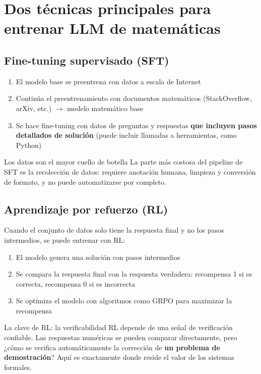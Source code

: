 \section{Dos técnicas principales para entrenar LLM de matemáticas}

\subsection{Fine-tuning supervisado (SFT)}

\begin{enumerate}
    \item El modelo base se preentrena con datos a escala de Internet
    \item Continúa el preentrenamiento con documentos matemáticos (StackOverflow, arXiv, etc.) $\to$ modelo matemático base
    \item Se hace fine-tuning con datos de preguntas y respuestas \textbf{que incluyen pasos detallados de solución} (puede incluir llamadas a herramientas, como Python)
\end{enumerate}

\begin{warningbox}{Los datos son el mayor cuello de botella}
La parte más costosa del pipeline de SFT es la recolección de datos: requiere anotación humana, limpieza y conversión de formato, y no puede automatizarse por completo.
\end{warningbox}

\subsection{Aprendizaje por refuerzo (RL)}

Cuando el conjunto de datos solo tiene la respuesta final y no los pasos intermedios, se puede entrenar con RL:
\begin{enumerate}
    \item El modelo genera una solución con pasos intermedios
    \item Se compara la respuesta final con la respuesta verdadera: recompensa 1 si es correcta, recompensa 0 si es incorrecta
    \item Se optimiza el modelo con algoritmos como GRPO para maximizar la recompensa
\end{enumerate}

\begin{importantbox}{La clave de RL: la verificabilidad}
RL depende de una señal de verificación confiable. Las respuestas numéricas se pueden comparar directamente, pero ¿cómo se verifica automáticamente la corrección de \textbf{un problema de demostración}? Aquí es exactamente donde reside el valor de los sistemas formales.
\end{importantbox}

